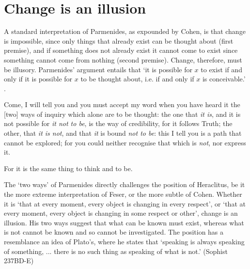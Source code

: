 \section{Change is an illusion}



A standard interpretation of Parmenides, as expounded by Cohen, is that change is impossible, since only things that already exist can be thought about (first premise), and if something does not already exist it cannot come to exist since something cannot come from nothing (second premise). Change, therefore, must be illusory. Parmenides' argument entails that `it is possible for $x$ to exist if and only if it is possible for $x$ to be thought about, i.e. if and only if $x$ is conceivable.' \parencite[][]{cohen-parm1}.
\begin{quoting}
Come, I will tell you {\textemdash} and you must accept my word when you have heard it {\textemdash} the [two] ways of inquiry which alone are to be thought: the one that \emph{it is}, and it is not possible for \emph{it not to be}, is the way of credibility, for it follows Truth; the other, that \emph{it is not}, and that \emph{it} is bound \emph{not to be}: this I tell you is a path that cannot be explored; for you could neither recognise that which is \emph{not}, nor express it. \parencite[][43]{fitt1983ancilla}
\end{quoting}
\begin{quoting}
For it is the same thing to think and to be. \parencite[][43]{fitt1983ancilla}
\end{quoting}

The `two ways' of Parmenides directly challenges the position of Heraclitus, be it the more extreme interpretation of Feser, or the more subtle of Cohen. Whether it is `that at every moment, every object is changing in every respect', or `that at every moment, every object is changing in some respect or other', change is an illusion. His two ways suggest that what can be known must exist, whereas what is not cannot be known and so cannot be investigated. The position has a resemblance an idea of Plato's, where he states that `speaking is always speaking of something, {...} there is no such thing as speaking of what is not.' (Sophist 237BD-E)

